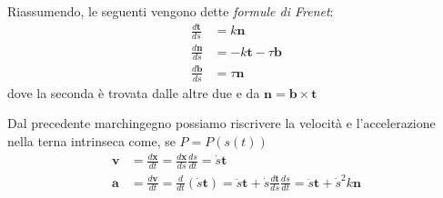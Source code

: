 Riassumendo, le seguenti vengono dette \emph{formule di Frenet}:
\begin{align*}
    \frac{d\mathbf{t} }{ds} &= k \mathbf{n}  \\
    \frac{d\mathbf{n} }{ds} &= -k \mathbf{t}  - \tau \mathbf{b}  \\
    \frac{d\mathbf{b} }{ds} &= \tau \mathbf{n}
\end{align*}
dove la seconda è trovata dalle altre due e da \(\mathbf{n} = \mathbf{b} \times
\mathbf{t} \) 

Dal precedente marchingegno possiamo riscrivere la velocità e l'accelerazione
nella terna intrinseca come, se \(P = P{(s{(t)})}\) 
\begin{align*}
    \mathbf{v}  &= \frac{d\mathbf{x} }{dt} = \frac{d\mathbf{x} }{ds}
    \frac{ds}{dt} = \dot{s} \mathbf{t}\\
    \mathbf{a} &= \frac{d\mathbf{v} }{dt} = \frac{d}{dt} (\dot{s} \mathbf{t}) =
    \ddot{s} \mathbf{t} + \dot{s} \frac{d\mathbf{t} }{ds} \frac{ds}{dt} =
    \ddot{s} \mathbf{t} + \dot{s}^2 k \mathbf{n}
\end{align*}




